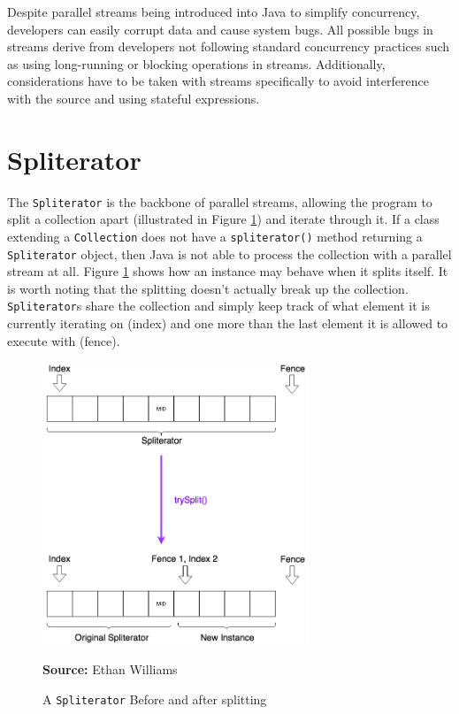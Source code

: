 \documentclass[oneside, 12pt]{article}
\newcommand{\source}[1]{\textbf{Source:} {#1} }
\begin{document}
Despite parallel streams being introduced into Java to simplify concurrency, developers can easily corrupt data and cause system bugs. All possible bugs in streams derive from developers not following standard concurrency practices such as using long-running or blocking operations in streams. Additionally, considerations have to be taken with streams specifically to avoid interference with the source and using stateful expressions.

\section{Spliterator}
The \verb|Spliterator| is the backbone of parallel streams, allowing the program to split a collection apart (illustrated in Figure \ref{fig:split}) and iterate through it. If a class extending a \verb|Collection| does not have a \verb|spliterator()| method returning a \verb|Spliterator| object, then Java is not able to process the collection with a parallel stream at all. Figure \ref{fig:split} shows how an instance may behave when it splits itself. It is worth noting that the splitting doesn't actually break up the collection. \verb|Spliterator|s share the collection and simply keep track of what element it is currently iterating on (index) and one more than the last element it is allowed to execute with (fence).

\begin{figure}[H]
\centering
\includegraphics[width=8cm]{../images/spliterator.png}
\caption{A {\tt Spliterator} Before and after splitting}
\source{Ethan Williams}
\label{fig:split}
\end{figure}
\end{document}
